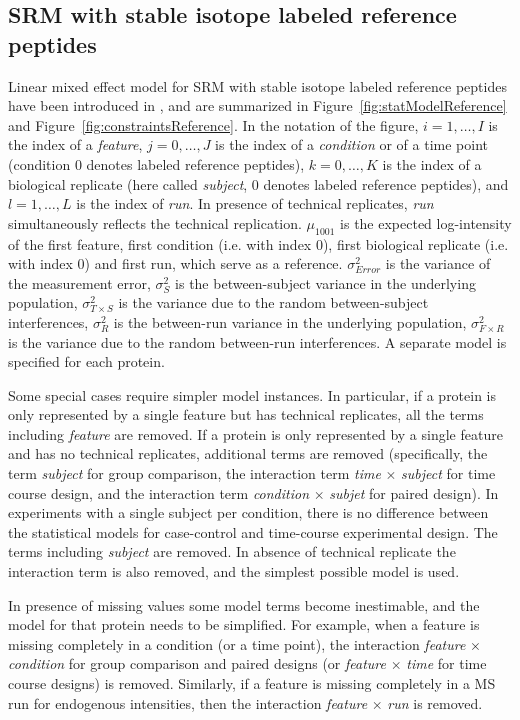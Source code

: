 \documentclass[11pt]{article}
\def\figref#1{Figure~\ref{fig:#1}}
\begin{document}
\subsection{SRM with stable isotope labeled reference peptides  \label{sec:formalStatsLabeled}}

Linear mixed effect model for SRM with stable isotope labeled reference peptides  have been introduced in \cite{Chang:2012uv}, and are summarized in \figref{statModelReference} and \figref{constraintsReference}. In the notation of the figure, 
$i=1,\ldots,I$ is the index of a {\it feature}, $j=0,\ldots,J$ is the index of a {\it condition} or of a time point (condition 0 denotes labeled reference peptides), $k=0,\ldots,K$ is the index of a biological replicate (here called {\it subject}, 0 denotes labeled reference peptides), and $l=1, \ldots, L$ is the index of {\it run}. In presence of technical replicates, {\it run} simultaneously reflects the technical replication. $\mu_{1001}$ is the expected log-intensity of the first feature, first condition (i.e. with index 0), first biological replicate (i.e. with index 0) and first run, which serve as a reference.  $\sigma^2_{Error}$ is the variance of the measurement error, $\sigma^2_{S}$ is the between-subject variance in the underlying population, $\sigma^2_{T\times S}$ is the variance due to the random between-subject interferences, $\sigma^2_{R}$ is the between-run variance in the underlying population, $\sigma^2_{F\times R}$ is the variance due to the random between-run interferences. A separate model is specified for each protein. 

Some special cases require simpler model instances. In particular, if a protein is only represented by a single feature but has technical replicates, all the terms including {\it feature} are removed. If a protein is only represented by a single feature and has no technical replicates, additional terms are removed (specifically, the term {\it subject} for group comparison, the interaction term {\it time} $\times$ {\it subject} for time course design, and the interaction term {\it condition} $\times$ {\it subjet} for paired design). In experiments with a single subject per condition, there is no difference between the statistical models for case-control and time-course experimental design. The terms including {\it subject} are removed. In absence of technical replicate the interaction term is also removed, and the simplest possible model is used.

In presence of missing values some model terms become inestimable, and the model for that protein needs to be simplified. For example, when a feature is missing completely in a condition (or a time point), the interaction {\it feature} $\times$ {\it condition} for group comparison and paired designs (or {\it feature} $\times$ {\it time} for time course designs) is removed. Similarly, if a feature is missing completely in a MS run for endogenous intensities, then the interaction {\it feature} $\times$ {\it run} is removed.
\end{document}
